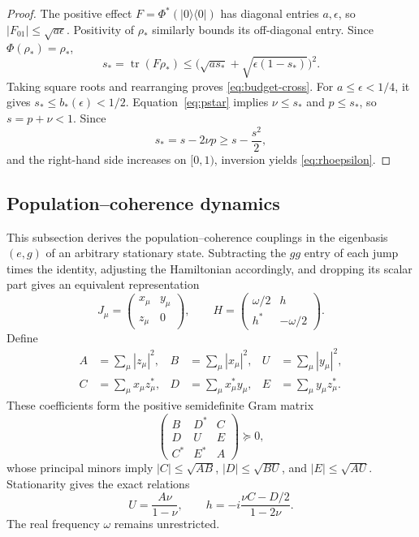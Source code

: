 \documentclass[aps,pra,reprint,amsmath,amssymb,nofootinbib,floatfix,longbibliography]{revtex4-2}
\theoremstyle{aps}
\DeclareMathOperator{\tr}{tr}
\newcommand{\eps}{\epsilon}
\newcommand{\proj}[1]{|#1\rangle\langle#1|}
\begin{document}
\begin{proof}
The positive effect $F=\Phi^*(\proj0)$ has diagonal entries $a,\eps$, so $|F_{01}|\le\sqrt{a\eps}$. Positivity of $\rho_*$ similarly bounds its off-diagonal entry. Since $\Phi(\rho_*)=\rho_*$,
\[
 s_*=\tr(F\rho_*)
 \le\bigl(\sqrt{as_*}+\sqrt{\eps(1-s_*)}\bigr)^2.
\]
Taking square roots and rearranging proves \eqref{eq:budget-cross}. For $a\le\eps<1/4$, it gives $s_*\le b_*(\eps)<1/2$. Equation~\eqref{eq:pstar} implies $\nu\le s_*$ and $p\le s_*$, so $s=p+\nu<1$. Since
\[
 s_*=s-2\nu p\ge s-\frac{s^2}{2},
\]
and the right-hand side increases on $[0,1)$, inversion yields \eqref{eq:rhoepsilon}.
\end{proof}

\subsection{Population--coherence dynamics}

This subsection derives the population--coherence couplings in the eigenbasis $(e,g)$ of an arbitrary stationary state. Subtracting the $gg$ entry of each jump times the identity, adjusting the Hamiltonian accordingly, and dropping its scalar part gives an equivalent representation
\begin{equation}\label{eq:gauge}
 J_\mu=\begin{pmatrix}x_\mu&y_\mu\\z_\mu&0\end{pmatrix},\qquad
 H=\begin{pmatrix}\omega/2&h\\h^*&-\omega/2\end{pmatrix}.
\end{equation}
Define
\begin{align}\label{eq:coefficients}
 A&=\sum_\mu|z_\mu|^2,& B&=\sum_\mu|x_\mu|^2,&
 U&=\sum_\mu|y_\mu|^2,\nonumber\\
 C&=\sum_\mu x_\mu z_\mu^*,&
 D&=\sum_\mu x_\mu^*y_\mu,&
 E&=\sum_\mu y_\mu z_\mu^*.
\end{align}
These coefficients form the positive semidefinite Gram matrix
\begin{equation}\label{eq:gram}
 \begin{pmatrix}B&D^*&C\\D&U&E\\C^*&E^*&A\end{pmatrix}\succeq0,
\end{equation}
whose principal minors imply
$|C|\le\sqrt{AB}$, $|D|\le\sqrt{BU}$, and $|E|\le\sqrt{AU}$.
Stationarity gives the exact relations
\begin{equation}\label{eq:stationarity}
 U=\frac{A\nu}{1-\nu},\qquad
 h=-i\frac{\nu C-D/2}{1-2\nu}.
\end{equation}
The real frequency $\omega$ remains unrestricted.
\end{document}
